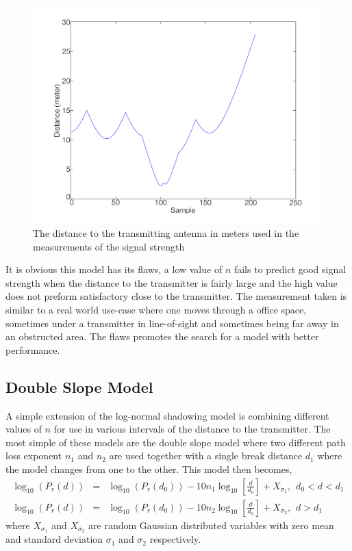 \documentclass{LTHthesis}
\begin{document}
%
\begin{figure}[!hbt]

\includegraphics[width=1\textwidth ]{images/signal_model/dist_trans}
\caption{The distance to the transmitting antenna in meters used in the measurements of the signal strength}\label{dist_trans}
\end{figure}

It is obvious this model has its flaws, a low value of $n$ fails to predict good signal strength when the distance to the transmitter is fairly large and the high value does not preform satisfactory close to the transmitter. The measurement taken is similar to a real world use-case where one moves through a office space, sometimes under a transmitter in line-of-sight and sometimes being far away in an obstructed area. The flaws promotes the search for a model with better performance.
%
\subsection{Double Slope Model}
%
A simple extension of the log-normal shadowing model is combining different values of $n$ for use in various intervals of the distance to the transmitter. The most simple of these models are the double slope model where two different path loss exponent $n_1$ and $n_2$ are used together with a single break distance $d_1$ where the model changes from one to the other. This model then becomes,
\begin{subequations}
\begin{align}
\log_{10}({P_r(d)})&=&\log_{10}({P_r(d_0)})-10n_1\log_{10}\left[{\frac{d}{d_0}}\right] + X_{\sigma_1}, \hspace{5pt} d_0<d<d_1\\
\log_{10}({P_r(d)})&=&\log_{10}({P_r(d_0)})-10n_2\log_{10}\left[{\frac{d}{d_0}}\right] + X_{\sigma_2}, \hspace{5pt} d>d_1
\end{align}
\end{subequations} 
where $X_{\sigma_1}$ and $X_{\sigma_2}$ are random Gaussian distributed variables with zero mean and standard deviation $\sigma_1$ and $\sigma_2$ respectively.
 
\end{document}
